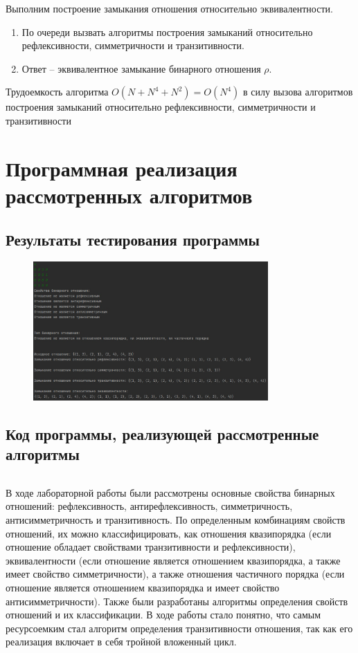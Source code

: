 \documentclass[bachelor, och, labwork]{shiza}
\begin{document}
Выполним построение замыкания отношения относительно эквивалентности.

\begin{enumerate}
    \item По очереди вызвать алгоритмы построения замыканий относительно рефлексивности,
    симметричности и транзитивности.
    \item Ответ -- эквивалентное замыкание бинарного отношения $\rho$.
\end{enumerate}
Трудоемкость алгоритма $O(N+N^4+N^2) = O(N^4)$ в силу вызова алгоритмов построения
замыканий относительно рефлексивности, симметричности и транзитивности

\section{Программная реализация рассмотренных алгоритмов}
    
    \subsection{Результаты тестирования программы}

        \begin{figure}[H]
            \centering
            \includegraphics[width=0.8\textwidth]{pic/1.jpg}
            \caption{}
        \end{figure}
    
    \subsection{Код программы, реализующей рассмотренные алгоритмы}
    
        \inputminted[linenos,breaklines=true, fontsize=\small, style=bw]{python}{code/lab1.py}

\conclusion
В ходе лабораторной работы были рассмотрены основные свойства бинарных отношений:
рефлексивность, антирефлексивность, симметричность, антисимметричность и 
транзитивность. По определенным комбинациям свойств отношений, их можно 
классифицировать, как отношения квазипорядка (если отношение обладает 
свойствами транзитивности и рефлексивности), эквивалентности (если отношение 
является отношением квазипорядка, а также имеет свойство симметричности), а 
также отношения частичного порядка (если отношение является отношением 
квазипорядка и имеет свойство антисимметричности). Также были разработаны 
алгоритмы определения свойств отношений и их классификации. В ходе работы стало 
понятно, что самым ресурсоемким стал алгоритм определения транзитивности 
отношения, так как его реализация включает в себя тройной вложенный цикл.
\end{document}
